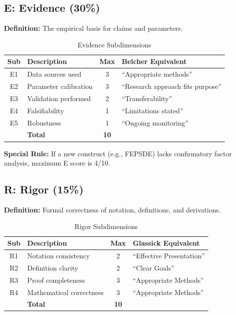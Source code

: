 \documentclass[11pt,a4paper]{article}
\begin{document}
\subsection{E: Evidence (30\%)}

\textbf{Definition:} The empirical basis for claims and parameters.

\begin{table}[h]
\centering
\caption{Evidence Subdimensions}
\begin{tabular}{clcp{6cm}}
\toprule
\textbf{Sub} & \textbf{Description} & \textbf{Max} & \textbf{Belcher Equivalent} \\
\midrule
E1 & Data sources used & 3 & ``Appropriate methods'' \\
E2 & Parameter calibration & 3 & ``Research approach fits purpose'' \\
E3 & Validation performed & 2 & ``Transferability'' \\
E4 & Falsifiability & 1 & ``Limitations stated'' \\
E5 & Robustness & 1 & ``Ongoing monitoring'' \\
\midrule
& \textbf{Total} & \textbf{10} & \\
\bottomrule
\end{tabular}
\end{table}

\textbf{Special Rule:} If a new construct (e.g., FEPSDE) lacks confirmatory factor analysis, maximum E score is 4/10.

\subsection{R: Rigor (15\%)}

\textbf{Definition:} Formal correctness of notation, definitions, and derivations.

\begin{table}[h]
\centering
\caption{Rigor Subdimensions}
\begin{tabular}{clcp{6cm}}
\toprule
\textbf{Sub} & \textbf{Description} & \textbf{Max} & \textbf{Glassick Equivalent} \\
\midrule
R1 & Notation consistency & 2 & ``Effective Presentation'' \\
R2 & Definition clarity & 2 & ``Clear Goals'' \\
R3 & Proof completeness & 3 & ``Appropriate Methods'' \\
R4 & Mathematical correctness & 3 & ``Appropriate Methods'' \\
\midrule
& \textbf{Total} & \textbf{10} & \\
\bottomrule
\end{tabular}
\end{table}
\end{document}
